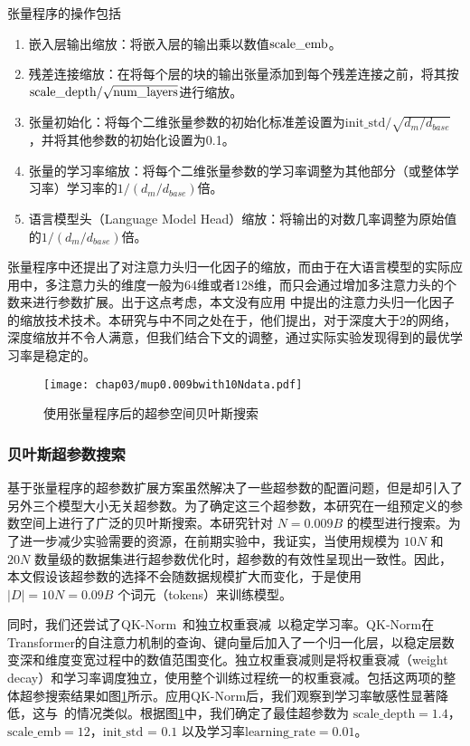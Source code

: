 张量程序的操作包括
\begin{enumerate}
  \item 嵌入层输出缩放：将嵌入层的输出乘以数值$\text{scale\_\text{emb}}$。
  \item 残差连接缩放：在将每个层的块的输出张量添加到每个残差连接之前，将其按$\text{scale\_\text{depth}}/\sqrt{\text{num\_layers}}$进行缩放。
  \item 张量初始化：将每个二维张量参数的初始化标准差设置为$\text{init\_std}/\sqrt{d_m/d_{base}}$，并将其他参数的初始化设置为0.1。
  \item 张量的学习率缩放：将每个二维张量参数的学习率调整为其他部分（或整体学习率）学习率的$1/({d_m/d_{base}})$倍。
  \item 语言模型头（Language Model Head）缩放：将输出的对数几率调整为原始值的$1/(d_m/d_{base})$倍。
\end{enumerate}

张量程序中还提出了对注意力头归一化因子的缩放，而由于在大语言模型的实际应用中，多注意力头的维度一般为64维或者128维，而只会通过增加多注意力头的个数来进行参数扩展。出于这点考虑，本文没有应用\citet{yang2022tensor} 中提出的注意力头归一化因子的缩放技术技术。本研究与\citet{yang2023tensor}中不同之处在于，他们提出，对于深度大于2的网络，深度缩放并不令人满意，但我们结合下文的调整，通过实际实验发现得到的最优学习率是稳定的。

\begin{figure}[htbp]
  \centering
  \texttt{[image: chap03/mup0.009bwith10Ndata.pdf]}
  \caption{使用张量程序后的超参空间贝叶斯搜索}
  \label{fig:mupsearch_app}
\end{figure}

\subsubsection{贝叶斯超参数搜索}
基于张量程序的超参数扩展方案虽然解决了一些超参数的配置问题，但是却引入了另外三个模型大小无关超参数。为了确定这三个超参数，本研究在一组预定义的参数空间上进行了广泛的贝叶斯搜索。本研究针对 $N = 0.009B$ 的模型进行搜索。为了进一步减少实验需要的资源，在前期实验中，我证实，当使用规模为 $10N$ 和 $20N$ 数量级的数据集进行超参数优化时，超参数的有效性呈现出一致性。因此，本文假设该超参数的选择不会随数据规模扩大而变化，于是使用 $|D| = 10N = 0.09B$ 个词元（tokens）来训练模型。

同时，我们还尝试了QK-Norm~\citep{henry-etal-2020-query}和独立权重衰减~\citep{loshchilov2017decoupled}以稳定学习率。QK-Norm在Transformer的自注意力机制的查询、键向量后加入了一个归一化层，以稳定层数变深和维度变宽过程中的数值范围变化。独立权重衰减则是将权重衰减（weight decay）和学习率调度独立，使用整个训练过程统一的权重衰减。包括这两项的整体超参搜索结果如图\ref{fig:mupsearch_app}所示。应用QK-Norm后，我们观察到学习率敏感性显著降低，这与~\citet{wortsman2023small}的情况类似。根据图\ref{fig:mupsearch_app}中，我们确定了最佳超参数为 $\text{scale\_depth} = 1.4$，$\text{scale\_emb} = 12$，$\text{init\_std = 0.1}$ 以及学习率$\text{learning\_rate} = 0.01$。



